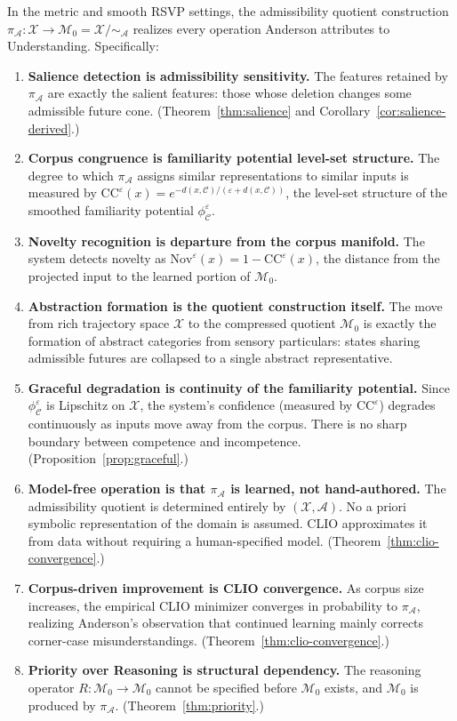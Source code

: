 \documentclass[12pt, a4paper, oneside]{book}
\newcommand{\Adm}{\mathcal{A}}
\newcommand{\X}{\mathcal{X}}
\newcommand{\M}{\mathcal{M}}
\newcommand{\C}{\mathcal{C}}
\newcommand{\projA}{\pi_{\!\Adm}}
\newcommand{\SA}{{\sim_{\!\Adm}}}
\newcommand{\Nov}{\mathrm{Nov}}
\newcommand{\CC}{\mathrm{CC}}
\newcommand{\phiCe}{\phi_{\C}^{\varepsilon}}
\begin{document}
\begin{theorem}
\label{thm:identification}
In the metric and smooth RSVP settings, the admissibility quotient
construction $\projA : \X \to \M_0 = \X/\SA$ realizes every operation
Anderson attributes to Understanding. Specifically:
\begin{enumerate}
  \item \textbf{Salience detection is admissibility sensitivity.}
    The features retained by $\projA$ are exactly the salient features:
    those whose deletion changes some admissible future cone.
    (Theorem~\ref{thm:salience} and Corollary~\ref{cor:salience-derived}.)
  \item \textbf{Corpus congruence is familiarity potential level-set structure.}
    The degree to which $\projA$ assigns similar representations to
    similar inputs is measured by $\CC^\varepsilon(x) = e^{-d(x,\C)/(\varepsilon+d(x,\C))}$,
    the level-set structure of the smoothed familiarity potential
    $\phiCe$.
  \item \textbf{Novelty recognition is departure from the corpus manifold.}
    The system detects novelty as $\Nov^\varepsilon(x) = 1 - \CC^\varepsilon(x)$,
    the distance from the projected input to the learned portion of $\M_0$.
  \item \textbf{Abstraction formation is the quotient construction itself.}
    The move from rich trajectory space $\X$ to the compressed quotient
    $\M_0$ is exactly the formation of abstract categories from sensory
    particulars: states sharing admissible futures are collapsed to a
    single abstract representative.
  \item \textbf{Graceful degradation is continuity of the familiarity
    potential.}
    Since $\phiCe$ is Lipschitz on $\X$, the system's confidence
    (measured by $\CC^\varepsilon$) degrades continuously as inputs
    move away from the corpus. There is no sharp boundary between
    competence and incompetence.
    (Proposition~\ref{prop:graceful}.)
  \item \textbf{Model-free operation is that $\projA$ is learned, not
    hand-authored.}
    The admissibility quotient is determined entirely by $(\X, \Adm)$.
    No a priori symbolic representation of the domain is assumed.
    CLIO approximates it from data without requiring a human-specified
    model.
    (Theorem~\ref{thm:clio-convergence}.)
  \item \textbf{Corpus-driven improvement is CLIO convergence.}
    As corpus size increases, the empirical CLIO minimizer converges in
    probability to $\projA$, realizing Anderson's observation that
    continued learning mainly corrects corner-case misunderstandings.
    (Theorem~\ref{thm:clio-convergence}.)
  \item \textbf{Priority over Reasoning is structural dependency.}
    The reasoning operator $R : \M_0 \to \M_0$ cannot be specified
    before $\M_0$ exists, and $\M_0$ is produced by $\projA$.
    (Theorem~\ref{thm:priority}.)
\end{enumerate}
\end{theorem}
\end{document}
